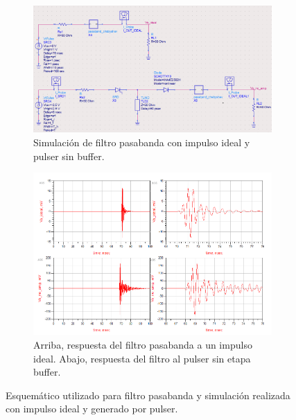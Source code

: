 \begin{figure}[t]
    \centering
    \begin{subfigure}[b]{0.45\textwidth}
        \centering
        \includegraphics[width=\textwidth]{images/passband_pulser_sim_no_amp.png}
        \caption{Simulación de filtro pasabanda con impulso ideal y pulser sin
        buffer.}
        \label{fig:passband_pulser_sim_no_amp}
    \end{subfigure}
    \hfill
    \begin{subfigure}[b]{0.45\textwidth}
        \centering
        \includegraphics[width=\textwidth]{images/passband_pulser_sim_no_amp_results.png}
        \caption{Arriba, respuesta del filtro pasabanda a un impulso ideal.
        Abajo, respuesta del filtro al pulser sin etapa buffer.}
        \label{fig:passband_pulser_sim_no_amp_results}
    \end{subfigure}
    \caption{Esquemático utilizado para filtro pasabanda y simulación realizada
    con impulso ideal y generado por pulser.}
    \label{fig:passband_cheby_and_with_pulser}
\end{figure}

